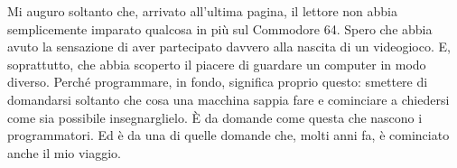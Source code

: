 \documentclass{article}
\begin{document}
Mi auguro soltanto che, arrivato all'ultima pagina, il lettore non abbia semplicemente imparato qualcosa in più sul
Commodore 64. Spero che abbia avuto la sensazione di aver partecipato davvero alla nascita di un videogioco. E,
soprattutto, che abbia scoperto il piacere di guardare un computer in modo diverso.\newline
Perché programmare, in fondo, significa proprio questo: smettere di domandarsi soltanto che cosa una macchina sappia
fare e cominciare a chiedersi come sia possibile insegnarglielo.\newline
È da domande come questa che nascono i programmatori.\newline
Ed è da una di quelle domande che, molti anni fa, è cominciato anche il mio viaggio.


\bigskip
\end{document}
